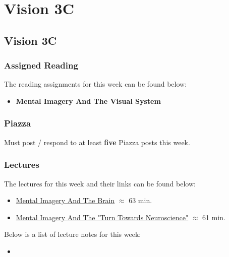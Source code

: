 \clearpage

\renewcommand{\ChapTitle}{Vision 3C}
\renewcommand{\SectionTitle}{Vision 3C}

\chapter{\ChapTitle}
\section{\SectionTitle}

\subsection{Assigned Reading}

The reading assignments for this week can be found below:

\begin{itemize}
    \item \textbf{Mental Imagery And The Visual System}
\end{itemize}

\subsection{Piazza}

Must post / respond to at least \textbf{five} Piazza posts this week.

\subsection{Lectures}

The lectures for this week and their links can be found below:

\begin{itemize}
    \item \href{https://www.youtube.com/watch?v=wd84A__AotM}{Mental Imagery And The Brain} $\approx$ 63 min.
    \item \href{https://www.youtube.com/watch?v=eMQgEd50_Cc}{Mental Imagery And The "Turn Towards Neuroscience"} $\approx$ 61 min.
\end{itemize}

\noindent Below is a list of lecture notes for this week:

\begin{itemize}
    \item {}
\end{itemize}

